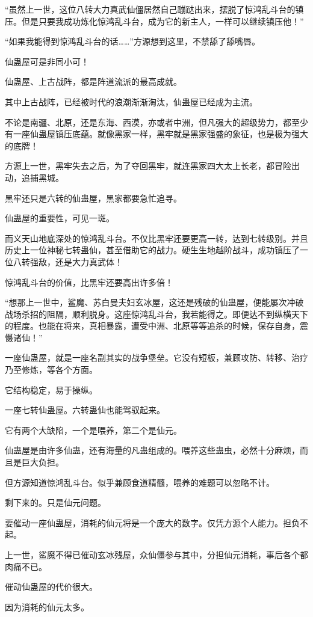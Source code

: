 \begin{this_body}
“虽然上一世，这位八转大力真武仙僵居然自己蹦跶出来，摆脱了惊鸿乱斗台的镇压。但是只要我成功炼化惊鸿乱斗台，成为它的新主人，一样可以继续镇压他！”

“如果我能得到惊鸿乱斗台的话……”方源想到这里，不禁舔了舔嘴唇。

仙蛊屋可是非同小可！

仙蛊屋、上古战阵，都是阵道流派的最高成就。

其中上古战阵，已经被时代的浪潮渐渐淘汰，仙蛊屋已经成为主流。

不论是南疆、北原，还是东海、西漠，亦或者中洲，但凡强大的超级势力，都至少有一座仙蛊屋镇压底蕴。就像黑家一样，黑牢就是黑家强盛的象征，也是极为强大的底牌！

方源上一世，黑牢失去之后，为了夺回黑牢，就连黑家四大太上长老，都冒险出动，追捕黑城。

黑牢还只是六转的仙蛊屋，黑家都要急忙追寻。

仙蛊屋的重要性，可见一斑。

而义天山地底深处的惊鸿乱斗台。不仅比黑牢还要更高一转，达到七转级别。并且历史上一位神秘七转蛊仙，甚至借助它的战力。硬生生地越阶战斗，成功镇压了一位八转强敌，还是大力真武体！

惊鸿乱斗台的价值，比黑牢还要高出许多倍！

“想那上一世中，鲨魔、苏白曼夫妇玄冰屋，这还是残破的仙蛊屋，便能屡次冲破战场杀招的阻隔，顺利脱身。这座惊鸿乱斗台，我若能得之。即便达不到纵横天下的程度。也能在将来，真相暴露，遭受中洲、北原等等追杀的时候，保存自身，震慑诸仙！”

一座仙蛊屋，就是一座名副其实的战争堡垒。它没有短板，兼顾攻防、转移、治疗乃至修炼，等各个方面。

它结构稳定，易于操纵。

一座七转仙蛊屋。六转蛊仙也能驾驭起来。

它有两个大缺陷，一个是喂养，第二个是仙元。

仙蛊屋是由许多仙蛊，还有海量的凡蛊组成的。喂养这些蛊虫，必然十分麻烦，而且是巨大负担。

但方源知道惊鸿乱斗台。似乎兼顾食道精髓，喂养的难题可以忽略不计。

剩下来的。只是仙元问题。

要催动一座仙蛊屋，消耗的仙元将是一个庞大的数字。仅凭方源个人能力。担负不起。

上一世，鲨魔不得已催动玄冰残屋，众仙僵参与其中，分担仙元消耗，事后各个都肉痛不已。

催动仙蛊屋的代价很大。

因为消耗的仙元太多。


\end{this_body}
